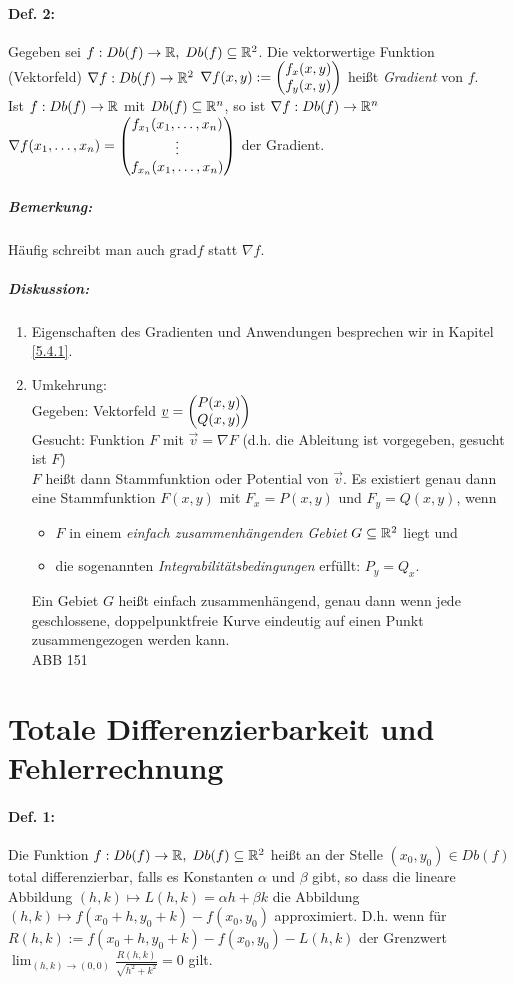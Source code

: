 \paragraph{Def. 2:} Gegeben sei $f:Db(f) \to \mathbb{R}, \; Db(f) \subseteq \mathbb{R}^2$. Die vektorwertige Funktion (Vektorfeld) $\nabla f: Db(f) \to \mathbb{R}^2$ $\nabla f(x,y) := \begin{pmatrix}f_x(x,y)\\ f_y(x,y)\end{pmatrix}$ heißt \emph{Gradient} von $f$.\\
Ist $f: Db(f) \to \mathbb{R}$ mit $Db(f) \subseteq \mathbb{R}^n$, so ist $\nabla f: Db(f)\to \mathbb{R}^n$ $\nabla f(x_1,\dots, x_n)=\begin{pmatrix}f_{x_1}(x_1,\dots, x_n)\\ \vdots \\ f_{x_n}(x_1,\dots, x_n)\end{pmatrix}$ der Gradient.

\subparagraph{Bemerkung:} Häufig schreibt man auch $\mathrm{grad}f$ statt $\nabla f$.

\subparagraph{Diskussion:}
\begin{enumerate}
\item Eigenschaften des Gradienten und Anwendungen besprechen wir in Kapitel \ref{5.4.1}.
\item Umkehrung: \\
Gegeben: Vektorfeld $\underline{v}=\begin{pmatrix}P(x,y)\\Q(x,y)\end{pmatrix}$\\
Gesucht: Funktion $F$ mit $\vec{v}=\nabla F$ (d.h. die Ableitung ist vorgegeben, gesucht ist $F$)\\
$F$ heißt dann Stammfunktion oder Potential von $\vec{v}$. Es existiert genau dann eine Stammfunktion $F(x,y)$ mit $F_x=P(x,y)$ und $F_y=Q(x,y)$, wenn 
\begin{itemize}
\item $F$ in einem \emph{einfach zusammenhängenden Gebiet} $G \subseteq \mathbb{R}^2$ liegt und
\item die sogenannten \emph{Integrabilitätsbedingungen} erfüllt: $P_y=Q_x$.
\end{itemize}
Ein Gebiet $G$ heißt einfach zusammenhängend, genau dann wenn jede geschlossene, doppelpunktfreie Kurve eindeutig auf einen Punkt zusammengezogen werden kann.\\
ABB 151
\end{enumerate}

\section{Totale Differenzierbarkeit und Fehlerrechnung}
\paragraph{Def. 1:} Die Funktion $f: Db(f) \to \mathbb{R}, \; Db(f) \subseteq \mathbb{R}^2$ heißt an der Stelle $(x_0,y_0)\in Db(f)$ total differenzierbar, falls es Konstanten $\alpha$ und $\beta$ gibt, so dass die lineare Abbildung $(h,k) \mapsto L(h,k) = \alpha h + \beta k$ die Abbildung $(h,k) \mapsto f(x_0 +h, y_0 + k) - f(x_0,y_0) $ approximiert. D.h. wenn für $R(h,k):= f(x_0+h, y_0 +k) - f(x_0,y_0) - L(h,k)$ der Grenzwert $\lim_{(h,k)\to (0,0)} \frac{R(h,k)}{\sqrt{h^2+k^2}}=0$ gilt.

